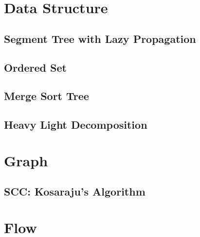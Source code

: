 \documentclass[10pt, a4paper]{article}
\begin{document}
\section{Data Structure}

\subsection{Segment Tree with Lazy Propagation}


\subsection{Ordered Set}


\subsection{Merge Sort Tree}


\subsection{Heavy Light Decomposition}




\section{Graph}

% 

\subsection{SCC: Kosaraju's Algorithm}


% 



\section{Flow}
\end{document}
